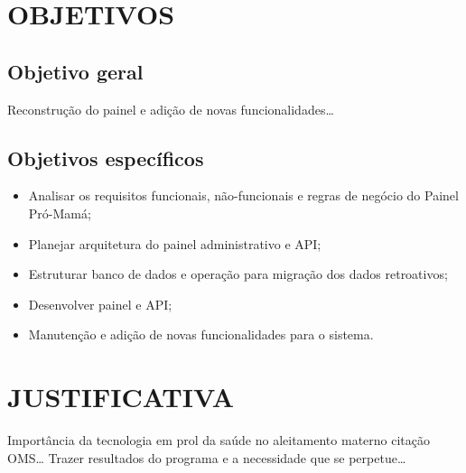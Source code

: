 \section{OBJETIVOS}

\subsection{Objetivo geral}

Reconstrução do painel e adição de novas funcionalidades…

\subsection{Objetivos específicos}

\begin{itemize}
  \item Analisar os requisitos funcionais, não-funcionais e regras de negócio do Painel Pró-Mamá;
  \item Planejar arquitetura do painel administrativo e API;
  \item Estruturar banco de dados e operação para migração dos dados retroativos;
  \item Desenvolver painel e API;
  \item Manutenção e adição de novas funcionalidades para o sistema.
\end{itemize}

\section{JUSTIFICATIVA}

Importância da tecnologia em prol da saúde no aleitamento materno citação OMS…
Trazer resultados do programa e a necessidade que se perpetue…

